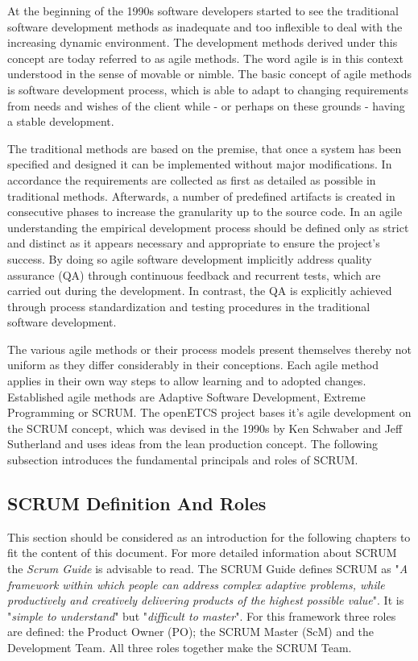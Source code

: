 At the beginning of the 1990s software developers started to see the traditional software development methods as inadequate and too inflexible to deal with the increasing dynamic environment. The development methods derived under this concept are today referred to as agile methods. The word agile is in this context understood in the sense of movable or nimble. The basic concept of agile methods is software development process, which is able to adapt to changing requirements from needs and wishes of the client while - or perhaps on these grounds - having a stable development. 

The traditional methods are based on the premise, that once a system has been specified and designed it can be implemented without major modifications. In accordance the requirements are collected as first as detailed as possible in traditional methods. Afterwards, a number of predefined artifacts is created in consecutive phases to increase the granularity up to the source code. In an agile understanding the empirical development process should be defined only as strict and distinct as it appears necessary and appropriate to ensure the project's success. By doing so agile software development implicitly address quality assurance (QA) through  continuous feedback and recurrent tests, which are carried out during the development. In contrast, the QA is explicitly achieved through process standardization and testing procedures in the traditional software development.

The various agile methods or their process models present themselves thereby not uniform as they differ considerably in their conceptions. Each agile method applies in their own way steps to allow learning and to adopted changes. Established agile methods are Adaptive Software Development, Extreme Programming or SCRUM. The openETCS project bases it's agile development on the SCRUM concept, which was devised in the 1990s by Ken Schwaber and Jeff Sutherland and uses ideas from the lean production concept. The following subsection introduces the fundamental principals and roles of SCRUM.


\subsection{SCRUM Definition And Roles}

This section should be considered as an introduction for the following chapters to fit the content of this document. For more detailed information about SCRUM the \textit{Scrum Guide} is advisable to read. The SCRUM Guide defines SCRUM as "\textit{A framework within which people can address complex adaptive problems, while productively and creatively delivering products of the highest possible value}". It is "\textit{simple to understand}" but "\textit{difficult to master}". For this framework three roles are defined: the Product Owner (PO); the SCRUM Master (ScM) and the Development Team. All three roles together make the SCRUM Team.

